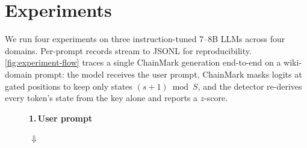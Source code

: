 
\section{Experiments}
\label{sec:experiments}

We run four experiments on three instruction-tuned 7--8B LLMs across
four domains. Per-prompt records stream to JSONL for reproducibility.
\autoref{fig:experiment-flow} traces a single ChainMark generation
end-to-end on a wiki-domain prompt: the model receives the user
prompt, ChainMark masks logits at gated positions to keep only
states $(s+1) \bmod S$, and the detector re-derives every token's
state from the key alone and reports a $z$-score.

\begin{figure}[t]
  \centering
  \newcommand{\tk}[2]{\tikz[baseline=(X.base)]\node[%
      rounded corners=1pt, draw=black!25, line width=0.2pt,%
      inner xsep=1.5pt, inner ysep=0.8pt, font=\scriptsize,%
      fill=#1!35] (X) {#2};}
  \newcommand{\tg}[2]{\tikz[baseline=(X.base)]\node[%
      rounded corners=1pt, draw=black!35, line width=0.3pt,%
      inner xsep=1.5pt, inner ysep=0.8pt, font=\scriptsize,%
      fill=#1!45] (X) {\underline{#2}};}
  \newcommand{\tarr}{\hspace{0.5pt}\textcolor{cmblue}{\scriptsize\ensuremath{\rightharpoonup}}\hspace{0.5pt}\allowbreak}
  \begin{minipage}{\columnwidth}
    \scriptsize
    \setlength{\fboxsep}{4pt}%
    \setlength{\fboxrule}{0.4pt}%

    {\small\bfseries 1.\,User prompt}\par
    \vspace{1pt}%
    \noindent{}\par
    \vspace{2pt}\centerline{\textcolor{cmblue}{\small$\Downarrow$}}\vspace{1pt}%


\end{minipage}
\end{figure}
